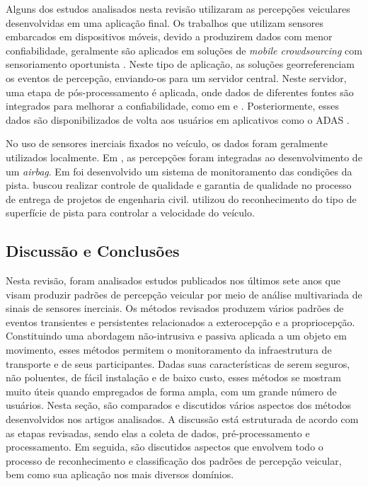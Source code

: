 Alguns dos estudos analisados nesta revisão utilizaram as percepções veiculares desenvolvidas em uma aplicação final. Os trabalhos que utilizam sensores embarcados em dispositivos móveis, devido a produzirem dados com menor confiabilidade, geralmente são aplicados em soluções de \textit{mobile crowdsourcing} com sensoriamento oportunista \cite{Afrin2015,Ghadge2015,Kaur2017,Kumar2017,Li2018,Lima2016,Pooja2017,Rishiwal2016,Savera2016,Singh2017, Strutu2013,Vittorio2014}. Neste tipo de aplicação, as soluções georreferenciam os eventos de percepção, enviando-os para um servidor central. Neste servidor, uma etapa de pós-processamento é aplicada, onde dados de diferentes fontes são integrados para melhorar a confiabilidade, como em  e . Posteriormente, esses dados são disponibilizados de volta aos usuários em aplicativos como o ADAS \cite{Afrin2015,Akhtar2014,Nalavde2015}.

No uso de sensores inerciais fixados no veículo, os dados foram geralmente utilizados localmente. Em , as percepções foram integradas ao desenvolvimento de um \textit{airbag}. Em  foi desenvolvido um sistema de monitoramento das condições da pista.  buscou realizar controle de qualidade e garantia de qualidade no processo de entrega de projetos de engenharia civil.  utilizou do reconhecimento do tipo de superfície de pista para controlar a velocidade do veículo.

\subsection{Discussão e Conclusões}

Nesta revisão, foram analisados estudos publicados nos últimos sete anos que visam produzir padrões de percepção veicular por meio de análise multivariada de sinais de sensores inerciais. Os métodos revisados produzem vários padrões de eventos transientes e persistentes relacionados a exterocepção e a propriocepção. Constituindo uma abordagem não-intrusiva e passiva aplicada a um objeto em movimento, esses métodos permitem o monitoramento da infraestrutura de transporte e de seus participantes. Dadas suas características de serem seguros, não poluentes, de fácil instalação e de baixo custo, esses métodos se mostram muito úteis quando empregados de forma ampla, com um grande número de usuários. Nesta seção, são comparados e discutidos vários aspectos dos métodos desenvolvidos nos artigos analisados. A discussão está estruturada de acordo com as etapas revisadas, sendo elas a coleta de dados, pré-processamento e processamento. Em seguida, são discutidos aspectos que envolvem todo o processo de reconhecimento e classificação dos padrões de percepção veicular, bem como sua aplicação nos mais diversos domínios.

